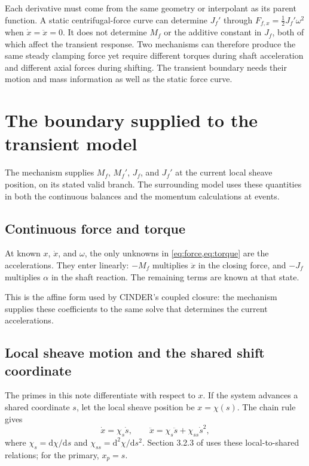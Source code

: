 \documentclass[11pt,letterpaper]{article}
\numberwithin{equation}{section}
\newcommand{\dd}{\mathrm{d}}
\newcommand{\half}{\tfrac12}
\newcommand{\source}{\cite{formulation}}
\begin{document}
Each derivative must come from the same geometry or interpolant as its parent function. A static centrifugal-force curve can determine $J_f'$ through $F_{f,x}=\half J_f'\omega^2$ when $\dot x=\ddot x=0$. It does not determine $M_f$ or the additive constant in $J_f$, both of which affect the transient response. Two mechanisms can therefore produce the same steady clamping force yet require different torques during shaft acceleration and different axial forces during shifting. The transient boundary needs their motion and mass information as well as the static force curve.

\section{The boundary supplied to the transient model}
\label{sec:interface}

The mechanism supplies $M_f$, $M_f'$, $J_f$, and $J_f'$ at the current local sheave position, on its stated valid branch. The surrounding model uses these quantities in both the continuous balances and the momentum calculations at events.

\subsection{Continuous force and torque}

At known $x$, $\dot x$, and $\omega$, the only unknowns in \cref{eq:force,eq:torque} are the accelerations. They enter linearly: $-M_f$ multiplies $\ddot x$ in the closing force, and $-J_f$ multiplies $\alpha$ in the shaft reaction. The remaining terms are known at that state.

This is the affine form used by CINDER's coupled closure: the mechanism supplies these coefficients to the same solve that determines the current accelerations.

\subsection{Local sheave motion and the shared shift coordinate}
\label{sec:coordinate}

The primes in this note differentiate with respect to $x$. If the system advances a shared coordinate $s$, let the local sheave position be $x=\chi(s)$. The chain rule gives
\begin{equation}
  \dot x=\chi_s\dot s,
  \qquad
  \ddot x=\chi_s\ddot s+\chi_{ss}\dot s^2,
  \label{eq:chain-rule}
\end{equation}
where $\chi_s=\dd\chi/\dd s$ and $\chi_{ss}=\dd^2\chi/\dd s^2$. Section 3.2.3 of \source{} uses these local-to-shared relations; for the primary, $x_p=s$.
\end{document}
